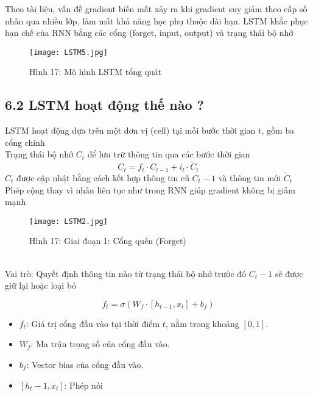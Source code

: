 \documentclass[a4paper,13pt]{article} %
\begin{document}
Theo tài liệu, vấn đề gradient biến mất xảy ra khi gradient suy giảm theo cấp số nhân qua nhiều lớp, làm mất khả năng học phụ thuộc dài hạn. LSTM khắc phục hạn chế của RNN bằng các cổng (forget, input, output) và trạng thái bộ nhớ

\begin{figure}[htbp]
    \centering
    \texttt{[image: LSTM5.jpg]}
    \caption*{Hình 17: Mô hình LSTM tổng quát\cite{key10} }
    \label{fig:model}
\end{figure}

\clearpage
\subsection{6.2 LSTM hoạt động thế nào ?}
LSTM hoạt động dựa trên một đơn vị (cell) tại mỗi bước thời gian t, gồm ba cổng chính \\
Trạng thái bộ nhớ \( {C}_t \) để lưu trữ thông tin qua các bước thời gian
\begin{equation}
C_t = f_t \cdot C_{t-1} + i_t \cdot \tilde{C}_t \tag{12}\label{eq:cell_state_update}
\end{equation}
\( {C}_t \) được cập nhật bằng cách kết hợp thông tin cũ  \( {C}_t-1 \) và thông tin mới \( \tilde{C}_t \) \\
Phép cộng thay vì nhân liên tục như trong RNN giúp gradient không bị giảm mạnh
\begin{figure}[htbp]
    \centering
    \texttt{[image: LSTM2.jpg]}
    \caption*{Hình 17: Giai đoạn 1: Cổng quên (Forget)\cite{key10} }
    \label{fig:model}
\end{figure}\\
Vai trò: Quyết định thông tin nào từ trạng thái bộ nhớ trước đó \( {C}_t-1 \) sẽ được giữ lại hoặc loại bỏ


\begin{equation}
f_t = \sigma(W_f \cdot [h_{t-1}, x_t] + b_f) \label{eq:input_gate} \tag{13}
\end{equation}
\begin{itemize}
    \item \( f_t \): Giá trị cổng đầu vào tại thời điểm \( t \), nằm trong khoảng \([0, 1]\).
    \item \( W_f \): Ma trận trọng số của cổng đầu vào.
    \item \( b_f \): Vector bias của cổng đầu vào.
    \item \( [h_t-1, x_t] \): Phép nối
\end{itemize}
\end{document}
